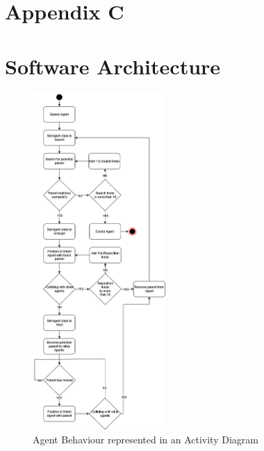 \newpage
\section*{Appendix C}
\section*{Software Architecture}
\label{append:c}
\begin{figure}[ht]
    \includegraphics[width=0.45\textwidth]{./Images/AgentActivityDiagram.png}
    \centering
    \caption{Agent Behaviour represented in an Activity Diagram}
    \label{activity-diagram}
\end{figure}